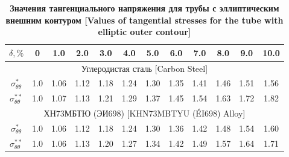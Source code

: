 \begin{table}[b!] \centering



\hypertarget{moskalik:tabl}{}



\begin{minipage}[t]{128mm}\small

\caption*{\bf Значения тангенциального напряжения для трубы с эллиптическим внешним контуром [Values of tangential stresses for  the tube with elliptic outer contour]}

\vspace{-3mm}

 \centering

\begin{tabular}{c|c|c|c|c|c|c|c|c|c|c|c}

\hline

\footnotesize $\delta, {\%} $ &\footnotesize  0  & \footnotesize 1{.}0 &\footnotesize  2{.}0&\footnotesize  3{.}0 &\footnotesize 4{.}0 &\footnotesize  5{.}0 &\footnotesize 6{.}0 &\footnotesize  7{.}0 &\footnotesize 8{.}0 &\footnotesize 9{.}0 &\footnotesize 10{.}0  \\

\hline

\multicolumn{12}{c}{\rule{0mm}{12pt}Углеродистая сталь [Carbon Steel]} \\

\hline

\rule{0mm}{12pt}%

\footnotesize $\sigma_{\theta\theta}^{*}$ & 1{.}0 & 1{.}06 & 1{.}12 & 1{.}18 & 1{.}24 & 1{.}30 & 1{.}35 & 1{.}41 & 1{.}46 & 1{.}51 & 1{.}56  \\

\footnotesize $\sigma_{\theta\theta}^{**}$ & 1{.}0 & 1{.}07 & 1{.}13 & 1{.}21 & 1{.}29 & 1{.}37 & 1{.}45 & 1{.}54 & 1{.}63 & 1{.}72 & 1{.}82  \\ \hline

\multicolumn{12}{c}{\rule{0mm}{12pt}ХН73МБТЮ (ЭИ698) [KHN73MBTYU (\'EI698) Alloy]} \\

\hline

\rule{0mm}{12pt}%

\footnotesize $\sigma_{\theta\theta}^{*}$ & 1{.}0 & 1{.}06 & 1{.}12 & 1{.}18 & 1{.}24 & 1{.}30 & 1{.}36 & 1{.}42 & 1{.}48 & 1{.}54 & 1{.}60   \\

\footnotesize $\sigma_{\theta\theta}^{**}$ & 1{.}0 & 1{.}06 & 1{.}13 & 1{.}20 & 1{.}27 & 1{.}34 & 1{.}42 & 1{.}49 & 1{.}57 & 1{.}64 & 1{.}71   \\ \hline

\end{tabular}\label{mos:tab1}

\end{minipage}

\end{table}





